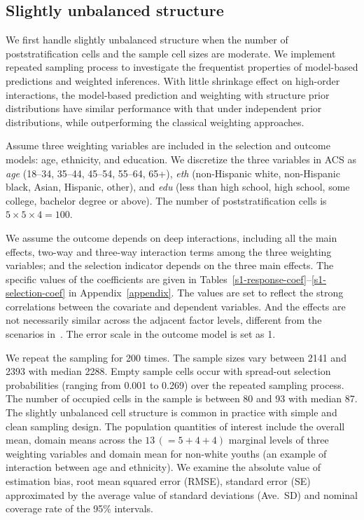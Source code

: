 \documentclass[11pt]{article}
\begin{document}
\subsection{Slightly unbalanced structure}
\label{3var}
We first handle slightly unbalanced structure when the number of poststratification cells and the sample cell sizes are moderate. We implement repeated sampling process to investigate the frequentist properties of model-based predictions and weighted inferences. With little shrinkage effect on high-order interactions, the model-based prediction and weighting with structure prior distributions have similar performance with that under independent prior distributions, while outperforming the classical weighting approaches. 

Assume three weighting variables are included in the selection and outcome models: age, ethnicity, and education. We discretize the three variables in ACS as {\em age} (18--34, 35--44, 45--54, 55--64, 65+), {\em eth} (non-Hispanic white, non-Hispanic black, Asian, Hispanic, other), and {\em edu} (less than high school, high school, some college, bachelor degree or above). The number of poststratification cells is $5\times 5 \times 4 = 100$. 

We assume the outcome depends on deep interactions, including all the main effects, two-way and three-way interaction terms among the three weighting variables; and the selection indicator depends on the three main effects. The specific values of the coefficients are given in Tables~\ref{s1-response-coef}--\ref{s1-selection-coef} in Appendix~\ref{appendix}. The values are set to reflect the strong correlations between the covariate and dependent variables. And the effects are not necessarily similar across the adjacent factor levels, different from the scenarios in~\cite{volfovsky:hoff14}. The error scale in the outcome model is set as 1. 

We repeat the sampling for 200 times. The sample sizes vary between 2141 and 2393 with median 2288. Empty sample cells occur with spread-out selection probabilities (ranging from 0.001 to 0.269) over the repeated sampling process. The number of occupied cells in the sample is between 80 and 93 with median 87. The slightly unbalanced cell structure is common in practice with simple and clean sampling design.
The population quantities of interest include the overall mean, domain means across the $13\, (=5+4+4)$ marginal levels of three weighting variables and domain mean for non-white youths (an example of interaction between age and ethnicity). We examine the absolute value of estimation bias, root mean squared error (RMSE), standard error (SE) approximated by the average value of standard deviations (Ave.\ SD) and nominal coverage rate of the 95\% intervals.
\end{document}
